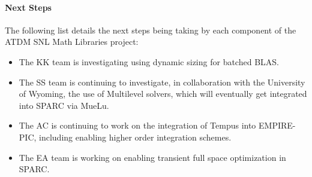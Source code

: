 \paragraph{Next Steps}
The following list details the next steps being taking by each component of the ATDM SNL Math Libraries project:

\begin{itemize}
\item The KK team is investigating using dynamic sizing for batched BLAS.
\item The SS team is continuing to investigate, in collaboration with the University of Wyoming, the use of Multilevel solvers, which will eventually get integrated into SPARC via MueLu.
\item The AC is continuing to work on the integration of Tempus into EMPIRE-PIC, including enabling higher order integration schemes.
\item The EA team is working on enabling transient full space optimization in SPARC.

\end{itemize}
